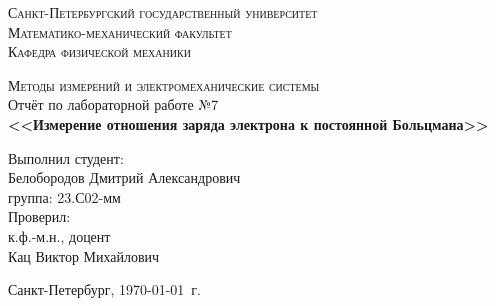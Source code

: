 \begin{titlepage}
\begin{center}
\textsc{Санкт-Петербургский государственный университет\\
Математико-механический факультет\\
Кафедра физической механики\\}

\vfill

\textsc{Методы измерений и электромеханические системы\\[3mm]}
Отчёт по лабораторной работе №7\\[6mm]


\textbf{\large<<Измерение отношения заряда электрона к постоянной Больцмана>>}

\vfill
\end{center}

\hfill
\begin{minipage}{.5\textwidth}
Выполнил студент:\\[2mm] 
Белобородов Дмитрий Александрович\\
группа: 23.С02-мм\\[5mm]

Проверил:\\[2mm] 
к.ф.-м.н., доцент\\
Кац Виктор Михайлович
\end{minipage}%
\vfill
\begin{center}
 Санкт-Петербург, \yeardate\today\ г.
\end{center}
\end{titlepage}